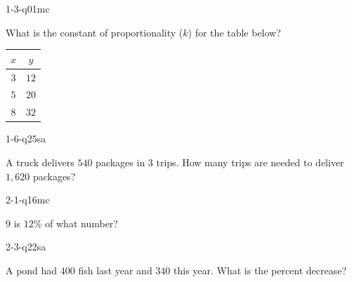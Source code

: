 
\begin{practiceQuestion}{1-3-q01}{mc}
\begin{questionText}
What is the constant of proportionality ($k$) for the table below?

\begin{center}
\begin{tabular}{|c|c|}
\hline $x$ & $y$ \\ \hline $3$ & $12$ \\ $5$ & $20$ \\ $8$ & $32$ \\ \hline
\end{tabular}
\end{center}
\end{questionText}
\end{practiceQuestion}

\begin{practiceQuestion}{1-6-q25}{sa}
\begin{questionText}
A truck delivers $540$ packages in $3$ trips. How many trips are needed to deliver $1{,}620$ packages?
\end{questionText}
\end{practiceQuestion}

\begin{practiceQuestion}{2-1-q16}{mc}
\begin{questionText}
$9$ is $12\%$ of what number?
\end{questionText}
\end{practiceQuestion}

\begin{practiceQuestion}{2-3-q22}{sa}
\begin{questionText}
A pond had $400$ fish last year and $340$ this year. What is the percent decrease?


\end{questionText}
\end{practiceQuestion}

